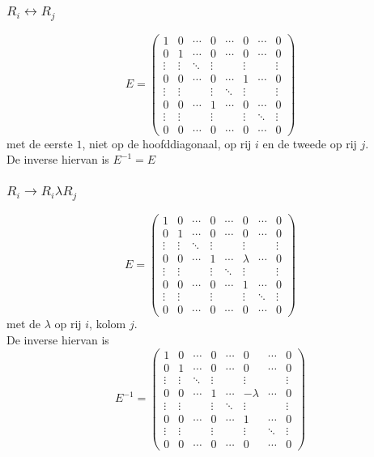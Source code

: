 \documentclass[10pt,a4paper]{article}
\begin{document}
\subsubsection*{$R_i \leftrightarrow R_j$}
\[
E=
\begin{pmatrix}
1 & 0 & \cdots & 0 & \cdots & 0 & \cdots & 0\\
0 & 1 & \cdots & 0 & \cdots & 0 & \cdots & 0\\
\vdots & \vdots & \ddots & \vdots& & \vdots & &\vdots\\
0 & 0 & \cdots & 0 & \cdots & 1 & \cdots & 0\\
\vdots & \vdots & & \vdots& \ddots & \vdots & &\vdots\\
0 & 0 & \cdots & 1 & \cdots & 0 & \cdots & 0\\
\vdots & \vdots & & \vdots & & \vdots & \ddots & \vdots\\
0 & 0 & \cdots & 0 & \cdots & 0 & \cdots & 0
\end{pmatrix}
\]
met de eerste $1$, niet op de hoofddiagonaal, op rij $i$ en de tweede op rij $j$.\\
De inverse hiervan is $E^{-1} = E$

\subsubsection*{$R_i \rightarrow R_i \lambda R_j$}
\[
E=
\begin{pmatrix}
1 & 0 & \cdots & 0 & \cdots & 0 & \cdots & 0\\
0 & 1 & \cdots & 0 & \cdots & 0 & \cdots & 0\\
\vdots & \vdots & \ddots & \vdots& & \vdots & &\vdots\\
0 & 0 & \cdots & 1 & \cdots & \lambda & \cdots & 0\\
\vdots & \vdots & & \vdots& \ddots & \vdots & &\vdots\\
0 & 0 & \cdots & 0 & \cdots & 1 & \cdots & 0\\
\vdots & \vdots & & \vdots & & \vdots & \ddots & \vdots\\
0 & 0 & \cdots & 0 & \cdots & 0 & \cdots & 0
\end{pmatrix}
\]
met de $\lambda$ op rij $i$, kolom $j$.\\
De inverse hiervan is 
\[
E^{-1}=
\begin{pmatrix}
1 & 0 & \cdots & 0 & \cdots & 0 & \cdots & 0\\
0 & 1 & \cdots & 0 & \cdots & 0 & \cdots & 0\\
\vdots & \vdots & \ddots & \vdots& & \vdots & &\vdots\\
0 & 0 & \cdots & 1 & \cdots & -\lambda & \cdots & 0\\
\vdots & \vdots & & \vdots& \ddots & \vdots & &\vdots\\
0 & 0 & \cdots & 0 & \cdots & 1 & \cdots & 0\\
\vdots & \vdots & & \vdots & & \vdots & \ddots & \vdots\\
0 & 0 & \cdots & 0 & \cdots & 0 & \cdots & 0
\end{pmatrix}
\]
\end{document}
